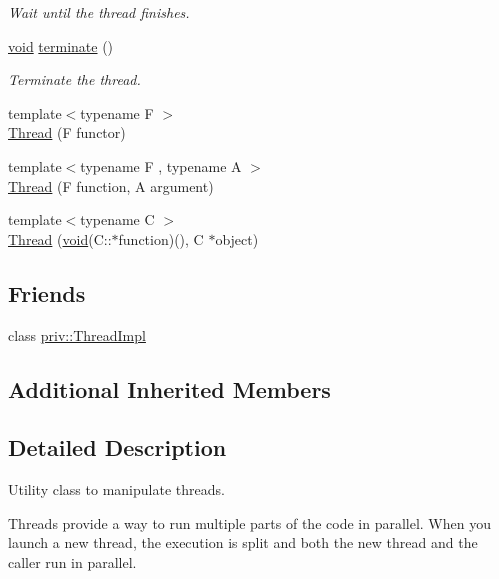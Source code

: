\begin{DoxyCompactItemize}
\begin{DoxyCompactList}\small\item\em Wait until the thread finishes. \end{DoxyCompactList}\item 
\hyperlink{glutf90_8h_ac778d6f63f1aaf8ebda0ce6ac821b56e}{void} \hyperlink{classsf_1_1_thread_ad6b205d4f1ce38b8d44bba0f5501477c}{terminate} ()
\begin{DoxyCompactList}\small\item\em Terminate the thread. \end{DoxyCompactList}\item 
{\footnotesize template$<$typename F $>$ }\\\hyperlink{classsf_1_1_thread_a00b88f036de66eb63765f4c12ceb6870}{Thread} (F functor)
\item 
{\footnotesize template$<$typename F , typename A $>$ }\\\hyperlink{classsf_1_1_thread_a719b2cc067d92d52c35064a49d850a53}{Thread} (F function, A argument)
\item 
{\footnotesize template$<$typename C $>$ }\\\hyperlink{classsf_1_1_thread_aa9f473c8cbb078900c62b1fd14a83a34}{Thread} (\hyperlink{glutf90_8h_ac778d6f63f1aaf8ebda0ce6ac821b56e}{void}(C\-::$\ast$function)(), C $\ast$object)
\end{DoxyCompactItemize}
\subsection*{Friends}
\begin{DoxyCompactItemize}
\item 
class \hyperlink{classsf_1_1_thread_a5ed4f3acfcb44de47de196437c39f9ef}{priv\-::\-Thread\-Impl}
\end{DoxyCompactItemize}
\subsection*{Additional Inherited Members}


\subsection{Detailed Description}
Utility class to manipulate threads. 

Threads provide a way to run multiple parts of the code in parallel. When you launch a new thread, the execution is split and both the new thread and the caller run in parallel.

